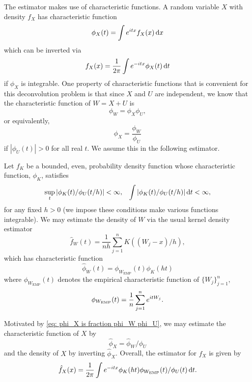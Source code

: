 	The estimator makes use of characteristic functions. A random variable $X$ with density $f_X$ has characteristic function
	\begin{equation}
		\phi_X(t) = \int e^{i t x} f_X(x) \, \mathrm{d} x
	\end{equation}
	which can be inverted via
	\begin{equation}
		f_X(x) = \frac{1}{2\pi} \int e^{-itx} \phi_X(t) \, \mathrm{d} t
	\end{equation}
	if $\phi_X$ is integrable. One property of characteristic functions that is convenient for this deconvolution problem is that since $X$ and $U$ are independent, we know that the characteristic function of $W = X+ U$ is
	\begin{equation}
		\phi_W = \phi_X \phi_U,
	\end{equation}
	or equivalently,
	\begin{equation}
		\phi_X = \frac{\phi_W}{\phi_U}
		\label{eq: phi_X is fraction phi_W phi_U}
	\end{equation}
	if $|\phi_U(t)| > 0$ for all real $t$. We assume this in the following estimator.

	Let $f_K$ be a bounded, even, probability density function whose characteristic function, $\phi_K$, satisfies
	\begin{align}
		\sup_t |\phi_K(t) / \phi_U(t / h) | < \infty, &&\int|\phi_K(t) / \phi_U(t / h)| \, \mathrm{d} t < \infty,
	\end{align}
	for any fixed $h > 0$ (we impose these conditions make various functions integrable). We may estimate the density of $W$ via the usual kernel density estimator
	\begin{equation}
		\hat{f}_W(t) = \frac{1}{n h} \sum_{j = 1}^n K((W_j - x)/h),
	\end{equation}
	which has characteristic function
	\begin{equation}
		\hat{\phi}_W(t) = \phi_{W_\mathrm{EMP}}(t) \phi_K(h t)
	\end{equation}
	where $\phi_{W_\mathrm{EMP}}(t)$ denotes the empirical characteristic function of $\{W_j\}_{j = 1}^n$,
	\begin{equation}
		\phi_{W_\mathrm{EMP}}(t) = \frac{1}{n}\sum_{j = 1}^n e^{itW_j}.
	\end{equation}

	Motivated by \eqref{eq: phi_X is fraction phi_W phi_U}, we may estimate the characteristic function of $X$ by 
	\begin{equation}
		\hat{\phi}_X = \hat{\phi}_W / \phi_U
	\end{equation}
	and the density of $X$ by inverting $\hat{\phi}_X$. Overall, the estimator for $f_X$ is given by
	\begin{equation}
	\label{eq:standard deconvolution estimator}
		\hat{f}_X(x) = \frac{1}{2\pi} \int e^{-itx} \phi_K(ht) \phi_{W_\mathrm{EMP}}(t)  / \phi_U(t) \, \mathrm{d} t.
	\end{equation}

